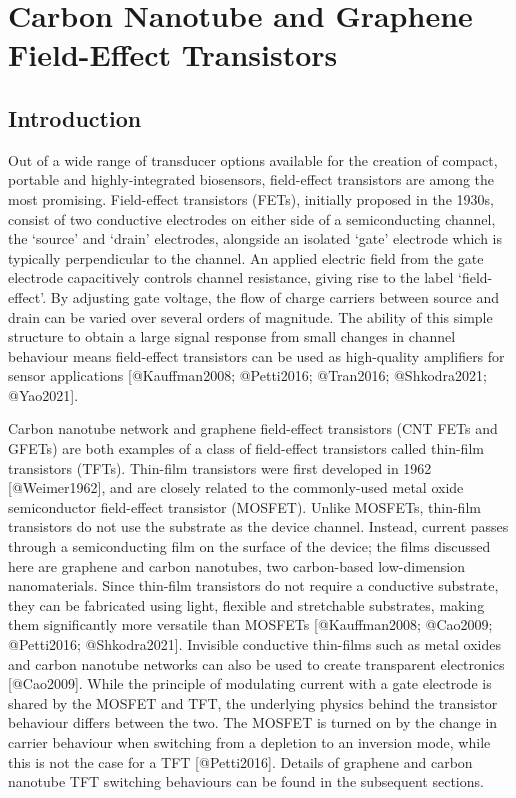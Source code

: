 \documentclass[
  letterpaper,
  DIV=11,
  numbers=noendperiod]{scrartcl}
\author{}
\date{}
\begin{document}
\section{Carbon Nanotube and Graphene Field-Effect
Transistors}\label{sec-thin-film-transistors}

\subsection{Introduction}\label{introduction}

Out of a wide range of transducer options available for the creation of
compact, portable and highly-integrated biosensors, field-effect
transistors are among the most promising. Field-effect transistors
(FETs), initially proposed in the 1930s, consist of two conductive
electrodes on either side of a semiconducting channel, the `source' and
`drain' electrodes, alongside an isolated `gate' electrode which is
typically perpendicular to the channel. An applied electric field from
the gate electrode capacitively controls channel resistance, giving rise
to the label `field-effect'. By adjusting gate voltage, the flow of
charge carriers between source and drain can be varied over several
orders of magnitude. The ability of this simple structure to obtain a
large signal response from small changes in channel behaviour means
field-effect transistors can be used as high-quality amplifiers for
sensor applications {[}@Kauffman2008; @Petti2016; @Tran2016;
@Shkodra2021; @Yao2021{]}.

Carbon nanotube network and graphene field-effect transistors (CNT FETs
and GFETs) are both examples of a class of field-effect transistors
called thin-film transistors (TFTs). Thin-film transistors were first
developed in 1962 {[}@Weimer1962{]}, and are closely related to the
commonly-used metal oxide semiconductor field-effect transistor
(MOSFET). Unlike MOSFETs, thin-film transistors do not use the substrate
as the device channel. Instead, current passes through a semiconducting
film on the surface of the device; the films discussed here are graphene
and carbon nanotubes, two carbon-based low-dimension nanomaterials.
Since thin-film transistors do not require a conductive substrate, they
can be fabricated using light, flexible and stretchable substrates,
making them significantly more versatile than MOSFETs {[}@Kauffman2008;
@Cao2009; @Petti2016; @Shkodra2021{]}. Invisible conductive thin-films
such as metal oxides and carbon nanotube networks can also be used to
create transparent electronics {[}@Cao2009{]}. While the principle of
modulating current with a gate electrode is shared by the MOSFET and
TFT, the underlying physics behind the transistor behaviour differs
between the two. The MOSFET is turned on by the change in carrier
behaviour when switching from a depletion to an inversion mode, while
this is not the case for a TFT {[}@Petti2016{]}. Details of graphene and
carbon nanotube TFT switching behaviours can be found in the subsequent
sections.
\end{document}
